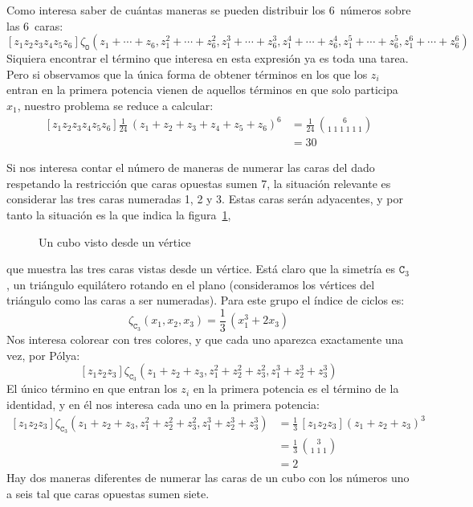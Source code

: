  Como interesa saber de cuántas maneras
  se pueden distribuir los 6~números sobre las 6~caras:
  \begin{equation*}
    \left[ z_1 z_2 z_3 z_4 z_5 z_6 \right]
      \zeta_{\mathtt{O}}(z_1 + \dotsb + z_6,
	      z_1^2 + \dotsb + z_6^2,
	      z_1^3 + \dotsb + z_6^3,
	      z_1^4 + \dotsb + z_6^4,
	      z_1^5 + \dotsb + z_6^5,
	      z_1^6 + \dotsb + z_6^6)
  \end{equation*}
  Siquiera encontrar el término que interesa en esta expresión
  ya es toda una tarea.
  Pero si observamos que la única forma
  de obtener términos en los que los \(z_i\)
  entran en la primera potencia vienen de aquellos términos
  en que solo participa \(x_1\),
  nuestro problema se reduce a calcular:
  \begin{align*}
    \left[ z_1 z_2 z_3 z_4 z_5 z_6 \right]
	\frac{1}{24} \, (z_1 + z_2 + z_3 + z_4 + z_5 + z_6)^6
      &= \frac{1}{24} \, \binom{6}{1\;1\;1\;1\;1\;1} \\
      &= 30
  \end{align*}

  Si nos interesa contar el número de maneras
  de numerar las caras del dado
  respetando la restricción que caras opuestas sumen 7,
  la situación relevante
  es considerar las tres caras numeradas 1, 2 y 3.
  Estas caras serán adyacentes,
  y por tanto la situación
  es la que indica la figura~\ref{fig:cubo-vertice},
  \begin{figure}[htbp]
    \centering
    \caption{Un cubo visto desde un vértice}
    \label{fig:cubo-vertice}
  \end{figure}
  que muestra las tres caras vistas desde un vértice.
  Está claro que la simetría es \(\mathtt{C}_3\),
  un triángulo equilátero rotando en el plano
  (consideramos los vértices del triángulo
   como las caras a ser numeradas).
  Para este grupo el índice de ciclos es:
  \begin{equation*}
    \zeta_{\mathtt{C}_3}(x_1, x_2, x_3)
      = \frac{1}{3} \,
	  \left(
	    x_1^3 + 2 x_3
	  \right)
  \end{equation*}
  Nos interesa colorear con tres colores,
  y que cada uno aparezca exactamente una vez,
  por Pólya:
  \begin{equation*}
    \left[ z_1 z_2 z_3 \right] \zeta_{\mathtt{C}_3}(z_1 + z_2 + z_3,
			      z_1^2 + z_2^2 + z_3^2,
			      z_1^3 + z_2^3 + z_3^3)
  \end{equation*}
  El único término en que entran los \(z_i\) en la primera potencia
  es el término de la identidad,
  y en él nos interesa cada uno en la primera potencia:
  \begin{align*}
    \left[ z_1 z_2 z_3 \right] \zeta_{\mathtt{C}_3}(z_1 + z_2 + z_3,
			      z_1^2 + z_2^2 + z_3^2,
			      z_1^3 + z_2^3 + z_3^3)
      &= \frac{1}{3} \, \left[
			  z_1 z_2 z_3
			\right] (z_1 + z_2 + z_3)^3 \\
      &= \frac{1}{3} \, \binom{3}{1\;1\;1} \\
      &= 2
  \end{align*}
  Hay dos maneras diferentes de numerar las caras de un cubo
  con los números uno a seis tal que caras opuestas sumen siete.

